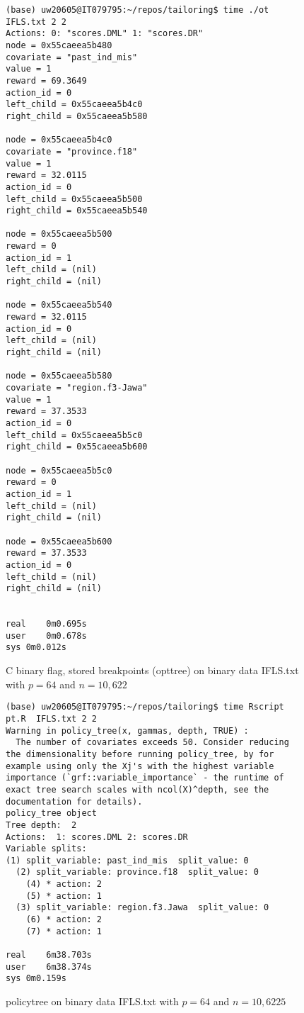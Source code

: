 \documentclass{article}
\begin{document}
\begin{figure}
  \centering
\begin{verbatim}
(base) uw20605@IT079795:~/repos/tailoring$ time ./ot IFLS.txt 2 2 
Actions: 0: "scores.DML" 1: "scores.DR" 
node = 0x55caeea5b480
covariate = "past_ind_mis"
value = 1
reward = 69.3649
action_id = 0
left_child = 0x55caeea5b4c0
right_child = 0x55caeea5b580

node = 0x55caeea5b4c0
covariate = "province.f18"
value = 1
reward = 32.0115
action_id = 0
left_child = 0x55caeea5b500
right_child = 0x55caeea5b540

node = 0x55caeea5b500
reward = 0
action_id = 1
left_child = (nil)
right_child = (nil)

node = 0x55caeea5b540
reward = 32.0115
action_id = 0
left_child = (nil)
right_child = (nil)

node = 0x55caeea5b580
covariate = "region.f3-Jawa"
value = 1
reward = 37.3533
action_id = 0
left_child = 0x55caeea5b5c0
right_child = 0x55caeea5b600

node = 0x55caeea5b5c0
reward = 0
action_id = 1
left_child = (nil)
right_child = (nil)

node = 0x55caeea5b600
reward = 37.3533
action_id = 0
left_child = (nil)
right_child = (nil)


real	0m0.695s
user	0m0.678s
sys	0m0.012s
\end{verbatim}
  \caption{C binary flag, stored breakpoints (opttree) on binary data IFLS.txt
        with $p=64$ and $n=10,622$}
\end{figure}

\begin{figure}
  \centering
\begin{verbatim}
(base) uw20605@IT079795:~/repos/tailoring$ time Rscript pt.R  IFLS.txt 2 2 
Warning in policy_tree(x, gammas, depth, TRUE) :
  The number of covariates exceeds 50. Consider reducing the dimensionality before running policy_tree, by for example using only the Xj's with the highest variable importance (`grf::variable_importance` - the runtime of exact tree search scales with ncol(X)^depth, see the documentation for details).
policy_tree object 
Tree depth:  2 
Actions:  1: scores.DML 2: scores.DR 
Variable splits: 
(1) split_variable: past_ind_mis  split_value: 0 
  (2) split_variable: province.f18  split_value: 0 
    (4) * action: 2 
    (5) * action: 1 
  (3) split_variable: region.f3.Jawa  split_value: 0 
    (6) * action: 2 
    (7) * action: 1 

real	6m38.703s
user	6m38.374s
sys	0m0.159s
\end{verbatim}
  \caption{policytree on binary data IFLS.txt
    with $p=64$ and $n=10,6225$}
\end{figure}
\end{document}
